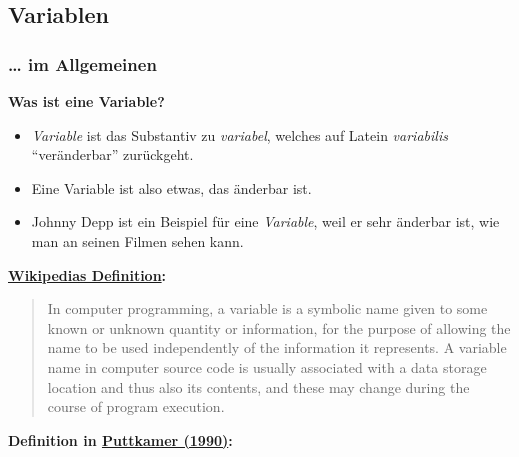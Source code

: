 
\subsection{\texorpdfstring{{Variablen}}{Variablen}}

\subsubsection{\texorpdfstring{{\ldots{} im
Allgemeinen}}{\ldots{} im Allgemeinen}}

\vspace{0.5cm}\par\noindent\textbf{Was ist eine Variable?}\vspace{0.5cm}

\begin{itemize}
\itemsep1pt\parskip0pt
\item
  {\emph{Variable} ist das Substantiv zu \emph{variabel}, welches auf
  Latein \emph{variabilis} ``veränderbar'' zurückgeht.}
\item
  {Eine Variable ist also etwas, das änderbar ist.}
\item
  {Johnny Depp ist ein Beispiel für eine \emph{Variable}, weil er sehr
  änderbar ist, wie man an seinen Filmen sehen kann.}
\end{itemize}



\vspace{0.5cm}\par\noindent\textbf{\href{http://de.wikipedia.org/wiki/variable_(programming)}{Wikipedias\vspace{0.5cm}
Definition}:}

\begin{quote}
In computer programming, a variable is a symbolic name given to some
known or unknown quantity or information, for the purpose of allowing
the name to be used independently of the information it represents. A
variable name in computer source code is usually associated with a data
storage location and thus also its contents, and these may change during
the course of program execution.
\end{quote}



\vspace{0.5cm}\par\noindent\textbf{Definition in\vspace{0.5cm}
\href{http://bibliography.lingpy.org?key=Puttkamer1990}{Puttkamer
(1990)}:}

